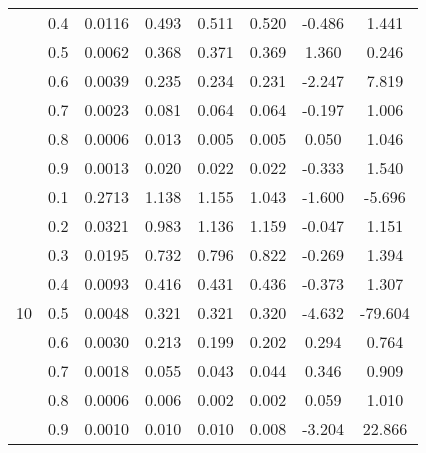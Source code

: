 \documentclass[11pt,a4paper]{report}
\begin{document}
\begin{longtable}{ | c | c || c | c | c | c | c | c | }
 & 0.4 & 0.0116 & 0.493 & 0.511 & 0.520 & -0.486 & 1.441 \\
 & 0.5 & 0.0062 & 0.368 & 0.371 & 0.369 & 1.360 & 0.246 \\
 & 0.6 & 0.0039 & 0.235 & 0.234 & 0.231 & -2.247 & 7.819 \\
 & 0.7 & 0.0023 & 0.081 & 0.064 & 0.064 & -0.197 & 1.006 \\
 & 0.8 & 0.0006 & 0.013 & 0.005 & 0.005 & 0.050 & 1.046 \\
 & 0.9 & 0.0013 & 0.020 & 0.022 & 0.022 & -0.333 & 1.540 \\
 \hline
\multirow{9}{*}{10} & 0.1 & 0.2713 & 1.138 & 1.155 & 1.043 & -1.600 & -5.696 \\
 & 0.2 & 0.0321 & 0.983 & 1.136 & 1.159 & -0.047 & 1.151 \\
 & 0.3 & 0.0195 & 0.732 & 0.796 & 0.822 & -0.269 & 1.394 \\
 & 0.4 & 0.0093 & 0.416 & 0.431 & 0.436 & -0.373 & 1.307 \\
 & 0.5 & 0.0048 & 0.321 & 0.321 & 0.320 & -4.632 & -79.604 \\
 & 0.6 & 0.0030 & 0.213 & 0.199 & 0.202 & 0.294 & 0.764 \\
 & 0.7 & 0.0018 & 0.055 & 0.043 & 0.044 & 0.346 & 0.909 \\
 & 0.8 & 0.0006 & 0.006 & 0.002 & 0.002 & 0.059 & 1.010 \\
 & 0.9 & 0.0010 & 0.010 & 0.010 & 0.008 & -3.204 & 22.866 \\
 \hline
\hline
\end{longtable}
\end{document}
